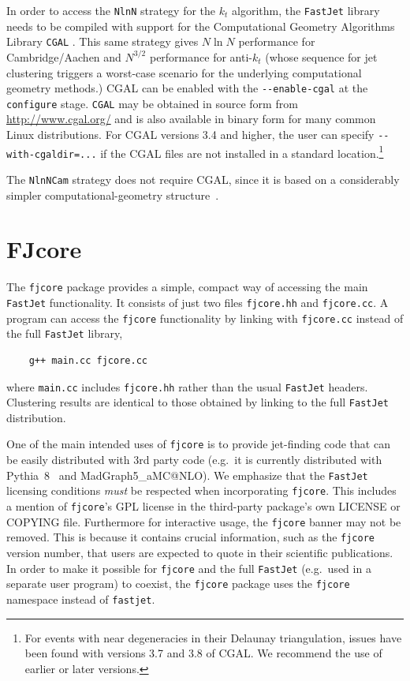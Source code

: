 \documentclass[12pt,a4]{article}
\newcommand{\fastjet}{\texttt{FastJet}\xspace}
\newcommand{\fjcore}{\texttt{fjcore}\xspace}
\newcommand{\ttt}[1]{{\small\texttt{#1}}}
\begin{document}
In order to access the \ttt{NlnN} strategy for the $k_t$ algorithm,
the \fastjet library needs to be compiled with support for the
Computational Geometry Algorithms Library \ttt{CGAL} \cite{CGAL}. This
same strategy gives $N\ln N$ performance for Cambridge/Aachen and
$N^{3/2}$ performance for anti-$k_t$ (whose sequence for jet
clustering triggers a worst-case scenario for the underlying
computational geometry methods.)
%
CGAL can be enabled with the \verb|--enable-cgal| at the
\ttt{configure} stage.
%
\ttt{CGAL} may be obtained in source form from
\url{http://www.cgal.org/} and is also available in binary form for
many common Linux distributions.
%
For CGAL versions 3.4 and higher, the user can specify
\verb|--with-cgaldir=...| if the CGAL files are not installed in a
standard location.\footnote{For events with near degeneracies in their
  Delaunay triangulation, issues have been found with versions 3.7 and
  3.8 of CGAL. We recommend the use of earlier or later versions.}

The \ttt{NlnNCam} strategy does not require CGAL, since it is based on
a considerably simpler computational-geometry structure~\cite{Chan}.

\section{FJcore}
\label{sec:fjcore}

The \ttt{fjcore} package provides a simple, compact way of accessing
the main \fastjet functionality.
%
It consists of just two files \ttt{fjcore.hh} and \ttt{fjcore.cc}.
%
A program can access the \ttt{fjcore} functionality by linking with
\ttt{fjcore.cc} instead of the full \fastjet library,
\begin{lstlisting}
    g++ main.cc fjcore.cc
\end{lstlisting}
where \ttt{main.cc} includes \ttt{fjcore.hh} rather than the usual
\fastjet headers.
%
Clustering results are identical to those obtained by linking to the
full \fastjet distribution.

One of the main intended uses of \fjcore is to provide jet-finding
code that can be easily distributed with 3rd party code (e.g.\ it is
currently distributed with Pythia~8~\cite{Sjostrand:2007gs} and
MadGraph5\_aMC@NLO).
%
We emphasize that the \fastjet licensing conditions \emph{must} be
respected when incorporating \fjcore.
%
This includes a mention of \fjcore's GPL license in the third-party
package's own LICENSE or COPYING file.
%
Furthermore for interactive usage, the \fjcore banner may not be
removed.
%
This is because it contains crucial information, such as the \fjcore version
number, that users are expected to quote in their scientific
publications.
%
In order to make it possible for \ttt{fjcore} and the full \fastjet
(e.g.\ used in a separate user program) to coexist, the \fjcore
package uses the \ttt{fjcore} namespace instead of \ttt{fastjet}.
\end{document}
